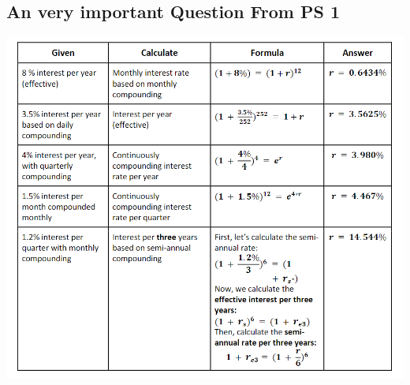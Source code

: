 \documentclass{article}
\begin{document}
\subsection*{An very important Question From PS 1}
\begin{center}
    \includegraphics[width=0.8\linewidth]{Q6_PS1.png}
\end{center}
\end{document}
